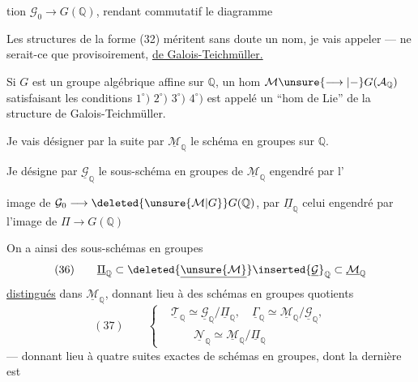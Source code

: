 tion $\mathcal{G}_0\longrightarrow G(\mathbb{Q})$, rendant  commutatif le diagramme

Les structures de la forme (32) méritent sans doute un nom, je vais  appeler --- ne serait-ce que provisoirement, \uline{ de Galois-Teichmüller.}

Si $G$ est un groupe algébrique affine sur $\mathbb{Q}$, un hom $\mathcal{M}\unsure{\longrightarrow|{-}}G(\mathcal{A}_{\mathbb{Q}})$ satisfaisant les conditions $1^{\circ})$ $2^{\circ})$ $3^{\circ})$  $4^{\circ})$ est appelé un ``hom de Lie'' de la structure de Galois-Teichmüller.

Je vais désigner par la suite par $\underline{\mathcal{M}}_{\mathbb{Q}}$  le schéma en groupes  sur $\mathbb{Q}$. 

Je désigne par  $\underline{\mathcal{G}}_{\mathbb{Q}}$ le sous-schéma en groupes de $\underline{\mathcal{M}}_{\mathbb{Q}}$ engendré par l'


image de $\mathcal{G}_0\longrightarrow\deleted{\unsure{\mathcal{M}|G}}G(\mathbb{Q})$, par $\underline{\Pi}_{\mathbb{Q}}$ celui engendré par l'image de $\Pi\longrightarrow G(\mathbb{Q})$

On a ainsi  des sous-schémas en groupes
\[
(36)\qquad \underline{\Pi}_{\mathbb{Q}}\subset
\deleted{\underline{\unsure{\mathcal{M}}}}\inserted{\underline{\mathcal{G}}}_{\mathbb{Q}}
\subset\underline{\mathcal{M}}_{\mathbb{Q}}
\]
\uline{distingués} dans $\underline{\mathcal{M}}_{\mathbb{Q}}$, donnant lieu à des schémas en groupes quotients
\[
(37)\qquad
\left\{
\begin{aligned}
&\underline{\mathcal{T}}_{\mathbb{Q}}\simeq
\underline{\mathcal{G}}_{\mathbb{Q}}/\underline{\Pi}_{\mathbb{Q}},\quad
\underline{\Gamma}_{\mathbb{Q}}\simeq
\underline{\mathcal{M}}_{\mathbb{Q}}/\underline{\mathcal{G}}_{\mathbb{Q}},\\
&\qquad\underline{\mathcal{N}}_{\mathbb{Q}}\simeq
\underline{\mathcal{M}}_{\mathbb{Q}}/\underline{\Pi}_{\mathbb{Q}}
\end{aligned}
\right.
\]
--- donnant lieu à quatre suites exactes de schémas en groupes, dont la dernière est


